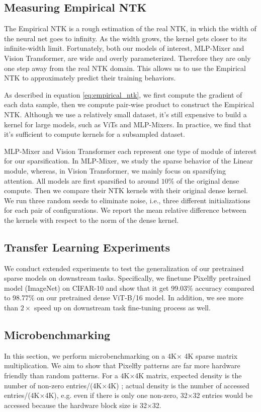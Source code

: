     

\subsection{Measuring Empirical NTK}
\label{app:ntk_exp}
The Empirical NTK is a rough estimation of the real NTK, in which the width of the neural net goes to infinity. As the width grows, the kernel gets closer to its infinite-width limit. Fortunately, both our models of interest, MLP-Mixer and Vision Transformer, are wide and overly parameterized. Therefore they are only one step away from the real NTK domain. This allows us to use the Empirical NTK to approximately predict their training behaviors.

As described in equation \ref{eq:empirical_ntk}, we first compute the gradient of each data sample, then we compute pair-wise product to construct the Empirical NTK. Although we use a relatively small dataset, it's still expensive to build a kernel for large models, such as ViTs and MLP-Mixers. In practice, we find that it's sufficient to compute kernels for a subsampled dataset.

MLP-Mixer and Vision Transformer each represent one type of module of interest for our sparsification. In MLP-Mixer, we study the sparse behavior of the Linear module, whereas, in Vision Transformer, we mainly focus on sparsifying attention. All models are first sparsified to around $10 \%$ of the original dense compute. Then we compare their NTK kernels with their original dense kernel. We run three random seeds to eliminate noise, i.e., three different initializations for each pair of configurations. We report the mean relative difference between the kernels with respect to the norm of the dense kernel.

\subsection{Transfer Learning Experiments}
\label{app:throughput}
We conduct extended experiments to test the generalization of our pretrained sparse models on downstream tasks. Specifically, we finetune Pixelfly pretrained model (ImageNet) on CIFAR-10 and show that it get 99.03\% accuracy compared to 98.77\% on our pretrained dense ViT-B/16 model. In addition, we see more than $2\times$ speed up on downstream task fine-tuning process as well.



\subsection{Microbenchmarking}
\label{app:study}
In this section, we perform microbenchmarking on a  4K$\times$ 4K sparse matrix multiplication. We aim to show that Pixelfly patterns are far more hardware friendly than random patterns. For a 4K$\times$4K matrix, expected density is the number of non-zero entries/(4K$\times$4K) ; actual density is the number of accessed entries/(4K$\times$4K), e.g. even if there is only one non-zero, 32$\times$32 entries would be accessed because the hardware block size is 32$\times$32. 

